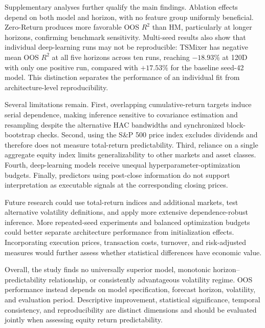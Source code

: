 \documentclass[runningheads,orivec]{llncs}
\begin{document}
Supplementary analyses further qualify the main findings. Ablation effects depend on both model and horizon, with no feature group uniformly beneficial. Zero-Return produces more favorable OOS $R^2$ than HM, particularly at longer horizons, confirming benchmark sensitivity. Multi-seed results also show that individual deep-learning runs may not be reproducible: TSMixer has negative mean OOS $R^2$ at all five horizons across ten runs, reaching $-18.93\%$ at 120D with only one positive run, compared with $+17.53\%$ for the baseline seed-42 model. This distinction separates the performance of an individual fit from architecture-level reproducibility.

Several limitations remain. First, overlapping cumulative-return targets induce serial dependence, making inference sensitive to covariance estimation and resampling despite the alternative HAC bandwidths and synchronized block-bootstrap checks. Second, using the S\&P 500 price index excludes dividends and therefore does not measure total-return predictability. Third, reliance on a single aggregate equity index limits generalizability to other markets and asset classes. Fourth, deep-learning models receive unequal hyperparameter-optimization budgets. Finally, predictors using post-close information do not support interpretation as executable signals at the corresponding closing prices.

Future research could use total-return indices and additional markets, test alternative volatility definitions, and apply more extensive dependence-robust inference. More repeated-seed experiments and balanced optimization budgets could better separate architecture performance from initialization effects. Incorporating execution prices, transaction costs, turnover, and risk-adjusted measures would further assess whether statistical differences have economic value.

Overall, the study finds no universally superior model, monotonic horizon--predictability relationship, or consistently advantageous volatility regime. OOS performance instead depends on model specification, forecast horizon, volatility, and evaluation period. Descriptive improvement, statistical significance, temporal consistency, and reproducibility are distinct dimensions and should be evaluated jointly when assessing equity return predictability.
\end{document}
